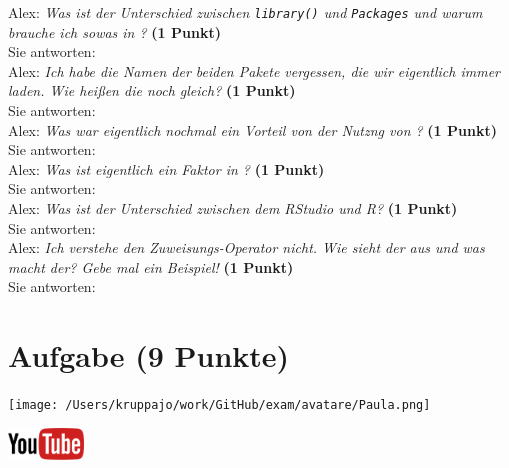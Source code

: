 \documentclass[a4paper, 9pt]{scrartcl}\usepackage[]{graphicx}\usepackage[]{xcolor}
\begin{document}
Alex: \textit{Was ist der Unterschied zwischen \texttt{library()} und \texttt{Packages} und warum brauche ich sowas in \Rlogo?} \textbf{(1 Punkt)}\\[1ex]
Sie antworten:\\[2Ex]

Alex: \textit{Ich habe die Namen der beiden \Rlogo Pakete vergessen, die wir eigentlich immer laden. Wie heißen die noch gleich?} \textbf{(1 Punkt)}\\[1ex]
Sie antworten:\\[2Ex]

Alex: \textit{Was war eigentlich nochmal ein Vorteil von der Nutzng von \Rlogo?} \textbf{(1 Punkt)}\\[1ex]
Sie antworten:\\[2Ex]

Alex: \textit{Was ist eigentlich ein Faktor in \Rlogo?} \textbf{(1 Punkt)}\\[1ex]
Sie antworten:\\[2Ex]

Alex: \textit{Was ist der Unterschied zwischen dem RStudio und R?} \textbf{(1 Punkt)}\\[1ex]
Sie antworten:\\[2Ex]

Alex: \textit{Ich verstehe den Zuweisungs-Operator nicht. Wie sieht der aus und was macht der? Gebe mal ein Beispiel!} \textbf{(1 Punkt)}\\[1ex]
Sie antworten:\\[2Ex] 
\clearpage

\section{Aufgabe \hfill (9 Punkte)}



 
\begin{minipage}[t]{0.5\textwidth}
\texttt{[image: /Users/kruppajo/work/GitHub/exam/avatare/Paula.png]}
\end{minipage}
\begin{minipage}[t]{0.5\textwidth}
\hfill
\href{https://www.youtube.com/playlist?list=PLe51bCp9JvEFUnFqaJG5aRmON9i1ZbOYC}{\includegraphics[width = 2cm]{img/youtube}}
\end{minipage}
\vspace{1ex}
\end{document}
